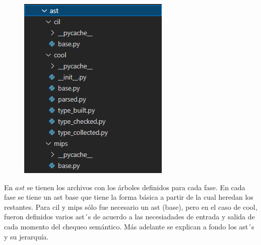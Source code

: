 \documentclass[a4paper,12pt]{article}
\begin{document}
\begin{figure}[H]
\centering
\includegraphics[width=0.9\linewidth]{./2}
\caption{}
\label{fig:2}
\end{figure}

En $ast$ se tienen los archivos con los árboles definidos para cada fase. En cada fase se tiene un ast base que tiene la forma básica a partir de la cual heredan los restantes. Para cil y mips sólo fue necesario un ast (base), pero en el caso de cool, fueron definidos varios ast´s de acuerdo a las necesiadades de entrada y salida de cada momento del chequeo semántico. Más adelante se explican a fondo los ast´s y su jerarquía.
\end{document}

